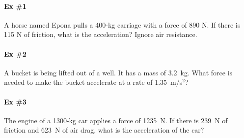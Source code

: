 \documentclass[12pt]{article}
\begin{document}
\pagestyle{empty}

\paragraph{Ex \#1} 

A horse named Epona pulls a 400-kg carriage with a force of 890 N.  If there is 115 N of friction, what is the acceleration?  Ignore air resistance.

\pagebreak

\paragraph{Ex \#2} 

A bucket is being lifted out of a well.  It has a mass of 3.2~kg.  What force is needed to make the bucket accelerate at a rate of 1.35~m/s$^2$?

\pagebreak

\paragraph{Ex \#3} 

The engine of a 1300-kg car applies a force of 1235~N.  If there is 239~N of friction and 623~N of air drag, what is the acceleration of the car?
\end{document}
